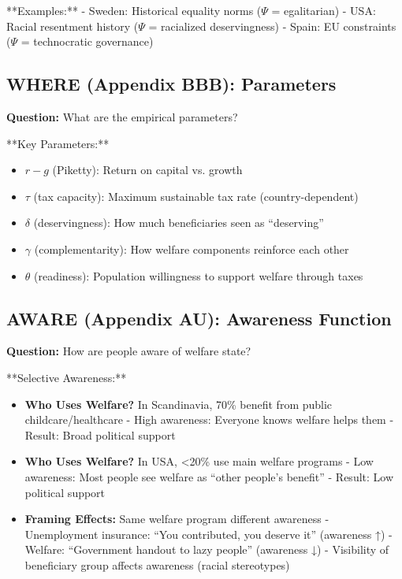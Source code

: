 **Examples:**
- Sweden: Historical equality norms ($\Psi$ = egalitarian)
- USA: Racial resentment history ($\Psi$ = racialized deservingness)
- Spain: EU constraints ($\Psi$ = technocratic governance)

\subsection{WHERE (Appendix BBB): Parameters}

\textbf{Question:} What are the empirical parameters?

**Key Parameters:**
\begin{itemize}
\item $r - g$ (Piketty): Return on capital vs. growth
\item $\tau$ (tax capacity): Maximum sustainable tax rate (country-dependent)
\item $\delta$ (deservingness): How much beneficiaries seen as ``deserving''
\item $\gamma$ (complementarity): How welfare components reinforce each other
\item $\theta$ (readiness): Population willingness to support welfare through taxes
\end{itemize}

\subsection{AWARE (Appendix AU): Awareness Function}

\textbf{Question:} How are people aware of welfare state?

**Selective Awareness:**
\begin{itemize}
\item \textbf{Who Uses Welfare?} In Scandinavia, 70\% benefit from public childcare/healthcare
- High awareness: Everyone knows welfare helps them
- Result: Broad political support

\item \textbf{Who Uses Welfare?} In USA, <20\% use main welfare programs
- Low awareness: Most people see welfare as ``other people's benefit''
- Result: Low political support

\item \textbf{Framing Effects:} Same welfare program different awareness
- Unemployment insurance: ``You contributed, you deserve it'' (awareness ↑)
- Welfare: ``Government handout to lazy people'' (awareness ↓)
- Visibility of beneficiary group affects awareness (racial stereotypes)
\end{itemize}

